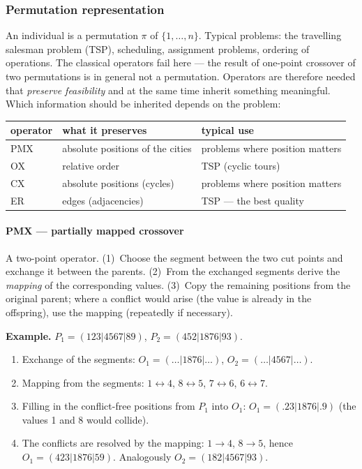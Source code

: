 \documentclass[11pt,a4paper]{article}
\theoremstyle{definition}
\begin{document}
\subsubsection{Permutation representation}

An individual is a permutation $\pi$ of $\{1,\dots,n\}$. Typical problems: the
travelling salesman problem (TSP), scheduling, assignment problems, ordering of
operations. The classical operators fail here --- the result of one-point
crossover of two permutations is in general not a permutation. Operators are
therefore needed that \emph{preserve feasibility} and at the same time inherit
something meaningful. Which information should be inherited depends on the
problem:

\begin{center}
\begin{tabular}{@{}lll@{}}
\toprule
\textbf{operator} & \textbf{what it preserves} & \textbf{typical use} \\
\midrule
PMX & absolute positions of the cities & problems where position matters \\
OX & relative order & TSP (cyclic tours) \\
CX & absolute positions (cycles) & problems where position matters \\
ER & edges (adjacencies) & TSP --- the best quality \\
\bottomrule
\end{tabular}
\end{center}

\paragraph{PMX --- partially mapped crossover}

\begin{defbox}
A two-point operator. (1)~Choose the segment between the two cut points and
exchange it between the parents. (2)~From the exchanged segments derive the
\emph{mapping} of the corresponding values. (3)~Copy the remaining positions
from the original parent; where a conflict would arise (the value is already in
the offspring), use the mapping (repeatedly if necessary).
\end{defbox}

\textbf{Example.} $P_1 = (123|4567|89)$, $P_2 = (452|1876|93)$.
\begin{enumerate}
\item Exchange of the segments: $O_1 = (\ldots|1876|\ldots)$,
  $O_2 = (\ldots|4567|\ldots)$.
\item Mapping from the segments: $1{\leftrightarrow}4$, $8{\leftrightarrow}5$,
  $7{\leftrightarrow}6$, $6{\leftrightarrow}7$.
\item Filling in the conflict-free positions from $P_1$ into $O_1$:
  $O_1 = (.23|1876|.9)$ (the values 1 and 8 would collide).
\item The conflicts are resolved by the mapping: $1 \to 4$, $8 \to 5$, hence
  $O_1 = (423|1876|59)$. Analogously $O_2 = (182|4567|93)$.
\end{enumerate}
\end{document}
